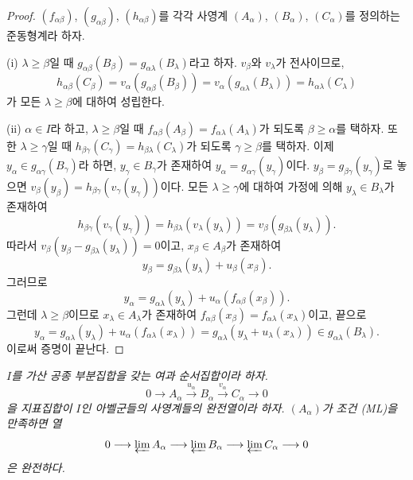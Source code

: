 \begin{proof}
$(f_{\alpha\beta})$, $(g_{\alpha\beta})$,
$(h_{\alpha\beta})$를 각각 사영계 $(A_\alpha)$, $(B_\alpha)$,
$(C_\alpha)$를 정의하는 준동형계라 하자.

(i) $\lambda\geq\beta$일 때
$g_{\alpha\beta}(B_\beta)=g_{\alpha\lambda}(B_\lambda)$라고 하자.
$v_\beta$와 $v_\lambda$가 전사이므로,
\[
h_{\alpha\beta}(C_\beta)
=v_\alpha(g_{\alpha\beta}(B_\beta))
=v_\alpha(g_{\alpha\lambda}(B_\lambda))
=h_{\alpha\lambda}(C_\lambda)
\]
가 모든 $\lambda\geq\beta$에 대하여 성립한다.

(ii) $\alpha\in I$라 하고, $\lambda\geq\beta$일 때
$f_{\alpha\beta}(A_\beta)=f_{\alpha\lambda}(A_\lambda)$가 되도록
$\beta\geq\alpha$를 택하자. 또한 $\lambda\geq\gamma$일 때
$h_{\beta\gamma}(C_\gamma)=h_{\beta\lambda}(C_\lambda)$가 되도록
$\gamma\geq\beta$를 택하자. 이제
$y_\alpha\in g_{\alpha\gamma}(B_\gamma)$라 하면,
$y_\gamma\in B_\gamma$가 존재하여
$y_\alpha=g_{\alpha\gamma}(y_\gamma)$이다.
$y_\beta=g_{\beta\gamma}(y_\gamma)$로 놓으면
$v_\beta(y_\beta)=h_{\beta\gamma}(v_\gamma(y_\gamma))$이다. 모든
$\lambda\geq\gamma$에 대하여 가정에 의해 $y_\lambda\in B_\lambda$가
존재하여
\[
h_{\beta\gamma}(v_\gamma(y_\gamma))
=h_{\beta\lambda}(v_\lambda(y_\lambda))
=v_\beta(g_{\beta\lambda}(y_\lambda)).
\]
따라서 $v_\beta(y_\beta-g_{\beta\lambda}(y_\lambda))=0$이고,
$x_\beta\in A_\beta$가 존재하여
\[
y_\beta=g_{\beta\lambda}(y_\lambda)+u_\beta(x_\beta).
\]
그러므로
\[
y_\alpha=g_{\alpha\lambda}(y_\lambda)
+u_\alpha(f_{\alpha\beta}(x_\beta)).
\]
그런데 $\lambda\geq\beta$이므로 $x_\lambda\in A_\lambda$가 존재하여
$f_{\alpha\beta}(x_\beta)=f_{\alpha\lambda}(x_\lambda)$이고, 끝으로
\[
y_\alpha
=g_{\alpha\lambda}(y_\lambda)+u_\alpha(f_{\alpha\lambda}(x_\lambda))
=g_{\alpha\lambda}(y_\lambda+u_\lambda(x_\lambda))
\in g_{\alpha\lambda}(B_\lambda).
\]
이로써 증명이 끝난다.
\end{proof}

\begin{proposition}[13.2.2]
\label{0.13.2.2-fr}
\emph{$I$를 가산 공종 부분집합을 갖는 여과 순서집합이라 하자.
\[
0\longrightarrow A_\alpha\xrightarrow{u_\alpha}B_\alpha
\xrightarrow{v_\alpha}C_\alpha\longrightarrow0
\]
을 지표집합이 $I$인 아벨군들의 사영계들의 완전열이라 하자.
$(A_\alpha)$가 조건 (ML)을 만족하면 열
\[
0\longrightarrow\varprojlim A_\alpha
\longrightarrow\varprojlim B_\alpha
\longrightarrow\varprojlim C_\alpha\longrightarrow0
\]
은 완전하다.}
\end{proposition}

